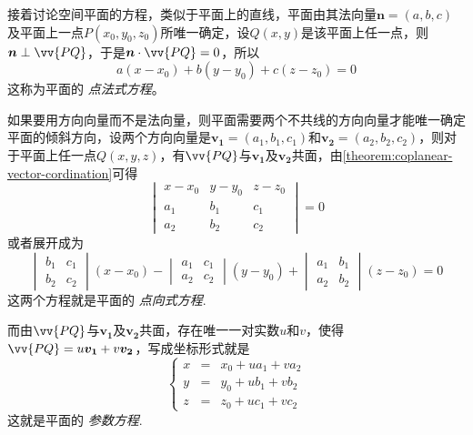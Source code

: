 接着讨论空间平面的方程，类似于平面上的直线，平面由其法向量$\bm{n}=(a,b,c)$及平面上一点$P(x_0,y_0,z_0)$所唯一确定，设$Q(x,y)$是该平面上任一点，则$\bm{n} \perp \vv{PQ}$，于是$\bm{n} \cdot \vv{PQ}=0$，所以
\[ a(x-x_0)+b(y-y_0)+c(z-z_0)=0 \]
这称为平面的 \emph{点法式方程}。

如果要用方向向量而不是法向量，则平面需要两个不共线的方向向量才能唯一确定平面的倾斜方向，设两个方向向量是$\bm{v_1}=(a_1,b_1,c_1)$和$\bm{v_2}=(a_2,b_2,c_2)$，则对于平面上任一点$Q(x,y,z)$，有$\vv{PQ}$与$\bm{v_1}$及$\bm{v_2}$共面，由\autoref{theorem:coplanear-vector-cordination}可得
\[
  \begin{vmatrix}
    x-x_0 & y-y_0 & z-z_0 \\
    a_1 & b_1 & c_1 \\
    a_2 & b_2 & c_2
  \end{vmatrix}
  =0
\]
或者展开成为
\[
  \begin{vmatrix}
    b_1 & c_1 \\
    b_2 & c_2
  \end{vmatrix}
  (x-x_0) -
  \begin{vmatrix}
    a_1 & c_1 \\
    a_2 & c_2
  \end{vmatrix}
  (y-y_0) +
  \begin{vmatrix}
    a_1 & b_1 \\
    a_2 & b_2
  \end{vmatrix}
  (z-z_0) = 0
\]
这两个方程就是平面的 \emph{点向式方程}.

而由$\vv{PQ}$与$\bm{v_1}$及$\bm{v_2}$共面，存在唯一一对实数$u$和$v$，使得$\vv{PQ}=u \bm{v_1} + v \bm{v_2}$，写成坐标形式就是
\[
  \left\{
    \begin{array}{lll}
      x & = & x_0 + u a_1 + v a_2 \\
      y & = & y_0 + u b_1 + v b_2 \\
      z & = & z_0 + u c_1 + v c_2
    \end{array}
    \right.
\]
这就是平面的 \emph{参数方程}.


